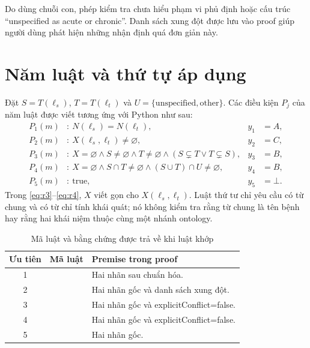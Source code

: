 Do dùng chuỗi con, phép kiểm tra chưa hiểu phạm vi phủ định hoặc cấu trúc
“unspecified as acute or chronic”. Danh sách xung đột được lưu vào proof
giúp người dùng phát hiện những nhận định quá đơn giản này.

\section{Năm luật và thứ tự áp dụng}
Đặt $S=T(\ell_s)$, $T=T(\ell_t)$ và
$U=\{\text{unspecified},\text{other}\}$.
Các điều kiện $P_j$ của năm luật được viết tương ứng với Python như sau:
\begin{align}
P_1(m)&:\ N(\ell_s)=N(\ell_t), & y_1&=A, \label{eq:r1}\\
P_2(m)&:\ X(\ell_s,\ell_t)\ne\varnothing, & y_2&=C, \label{eq:r2}\\
P_3(m)&:\ X=\varnothing \land S\ne\varnothing\land T\ne\varnothing
            \land(S\subsetneq T\lor T\subsetneq S), & y_3&=B, \label{eq:r3}\\
P_4(m)&:\ X=\varnothing \land S\cap T\ne\varnothing
            \land(S\cup T)\cap U\ne\varnothing, & y_4&=B, \label{eq:r4}\\
P_5(m)&:\ \mathrm{true}, & y_5&=\bot. \label{eq:r5}
\end{align}
Trong \eqref{eq:r3}--\eqref{eq:r4}, $X$ viết gọn cho
$X(\ell_s,\ell_t)$. Luật thứ tư chỉ yêu cầu có từ chung và có từ chỉ tính
khái quát; nó không kiểm tra rằng từ chung là tên bệnh hay rằng hai
khái niệm thuộc cùng một nhánh ontology.

\begin{table}[htbp]
\centering\small
\caption{Mã luật và bằng chứng được trả về khi luật khớp}\label{tab:rules}
\begin{tabularx}{\textwidth}{c p{6.0cm} Y}
\toprule
Ưu tiên & Mã luật & Premise trong proof\\
 &  & Hai nhãn sau chuẩn hóa.\\
2 &  & Hai nhãn gốc và danh sách xung đột.\\
3 &  & Hai nhãn gốc và explicitConflict=false.\\
4 &  & Hai nhãn gốc và explicitConflict=false.\\
5 &  & Hai nhãn gốc.\\
\bottomrule
\end{tabularx}
\end{table}

